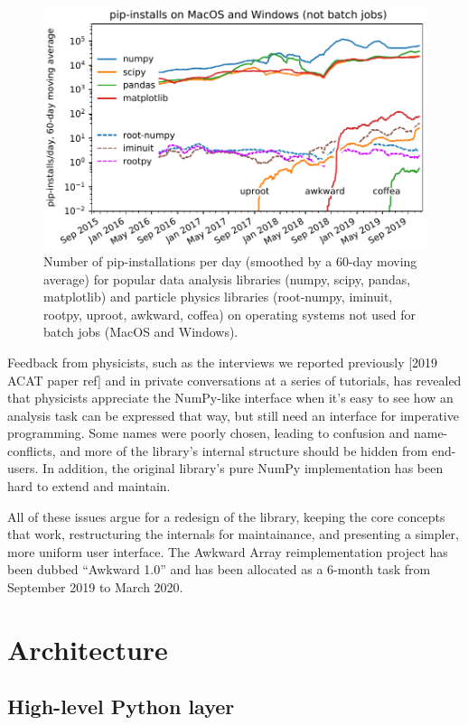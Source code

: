 \documentclass{webofc}
\begin{document}
\begin{figure}
\begin{center}
\includegraphics[width=0.75\linewidth]{pip-timeline.pdf}
\end{center}
\caption{Number of pip-installations per day (smoothed by a 60-day moving average) for popular data analysis libraries (numpy, scipy, pandas, matplotlib) and particle physics libraries (root-numpy, iminuit, rootpy, uproot, awkward, coffea) on operating systems not used for batch jobs (MacOS and Windows). \label{fig:pip-timeline}}
\end{figure}

Feedback from physicists, such as the interviews we reported previously [2019 ACAT paper ref] and in private conversations at a series of tutorials, has revealed that physicists appreciate the NumPy-like interface when it's easy to see how an analysis task can be expressed that way, but still need an interface for imperative programming. Some names were poorly chosen, leading to confusion and name-conflicts, and more of the library's internal structure should be hidden from end-users. In addition, the original library's pure NumPy implementation has been hard to extend and maintain.

All of these issues argue for a redesign of the library, keeping the core concepts that work, restructuring the internals for maintainance, and presenting a simpler, more uniform user interface. The Awkward Array reimplementation project has been dubbed ``Awkward 1.0'' and has been allocated as a 6-month task from September 2019 to March 2020.

\section{Architecture}

\subsection{High-level Python layer}
\end{document}

